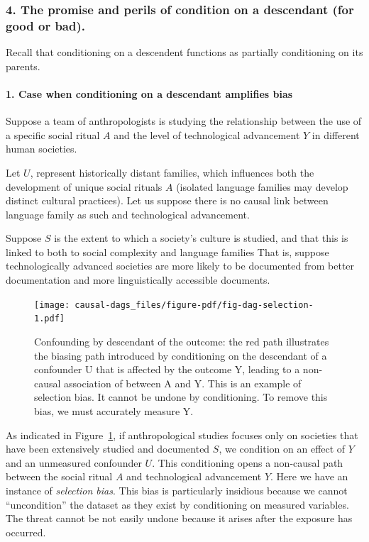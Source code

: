 \documentclass[
  singlecolumn,
  9pt]{article}
\let\oldparagraph\paragraph
\renewcommand{\paragraph}[1]{\oldparagraph{#1}\mbox{}}
\begin{document}
\subsubsection{4. The promise and perils of condition on a descendant
(for good or
bad).}\label{the-promise-and-perils-of-condition-on-a-descendant-for-good-or-bad.}

Recall that conditioning on a descendent functions as partially
conditioning on its parents.

\paragraph{1. Case when conditioning on a descendant amplifies
bias}\label{case-when-conditioning-on-a-descendant-amplifies-bias}

Suppose a team of anthropologists is studying the relationship between
the use of a specific social ritual \(A\) and the level of technological
advancement \(Y\) in different human societies.

Let \(U\), represent historically distant families, which influences
both the development of unique social rituals \(A\) (isolated language
families may develop distinct cultural practices). Let us suppose there
is no causal link between language family as such and technological
advancement.

Suppose \(S\) is the extent to which a society's culture is studied, and
that this is linked to both to social complexity and language families
That is, suppose technologically advanced societies are more likely to
be documented from better documentation and more linguistically
accessible documents.

\begin{figure}

{\centering \texttt{[image: causal-dags\_files/figure-pdf/fig-dag-selection-1.pdf]}

}

\caption{\label{fig-dag-selection}Confounding by descendant of the
outcome: the red path illustrates the biasing path introduced by
conditioning on the descendant of a confounder U that is affected by the
outcome Y, leading to a non-causal association of between A and Y. This
is an example of selection bias. It cannot be undone by conditioning. To
remove this bias, we must accurately measure Y.}

\end{figure}

As indicated in Figure~\ref{fig-dag-selection}, if anthropological
studies focuses only on societies that have been extensively studied and
documented \(S\), we condition on an effect of \(Y\) and an unmeasured
confounder \(U\). This conditioning opens a non-causal path between the
social ritual \(A\) and technological advancement \(Y\). Here we have an
instance of \emph{selection bias}. This bias is particularly insidious
because we cannot ``uncondition'' the dataset as they exist by
conditioning on measured variables. The threat cannot be not easily
undone because it arises after the exposure has occurred.
\end{document}
